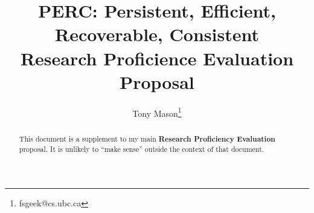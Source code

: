 \documentclass[letterpaper,twocolumn,10pt]{article}
\begin{document}
    
    \title{PERC: Persistent, Efficient, Recoverable, Consistent \\
           Research Proficience Evaluation Proposal
    }
    
    
    \author{Tony Mason\thanks{fsgeek@cs.ubc.ca}}
    
    \date{}
    
    \maketitle
    
    \begin{abstract}
        This document is a supplement to my main \textbf{Research Proficiency Evaluation} proposal.  It is unlikely
        to ``make sense'' outside the context of that document.
  
    \end{abstract}
    
    
    
    \newpage
    \balance
    
    {\footnotesize 
    }
    
    
    
    
\end{document}
